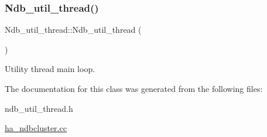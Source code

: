\subsubsection{\texorpdfstring{Ndb\+\_\+util\+\_\+thread()}{Ndb\_util\_thread()}}
{\footnotesize\ttfamily Ndb\+\_\+util\+\_\+thread\+::\+Ndb\+\_\+util\+\_\+thread (\begin{DoxyParamCaption}{ }\end{DoxyParamCaption})}

Utility thread main loop. 

The documentation for this class was generated from the following files\+:\begin{DoxyCompactItemize}
\item 
ndb\+\_\+util\+\_\+thread.\+h\item 
\mbox{\hyperlink{ha__ndbcluster_8cc}{ha\+\_\+ndbcluster.\+cc}}\end{DoxyCompactItemize}
